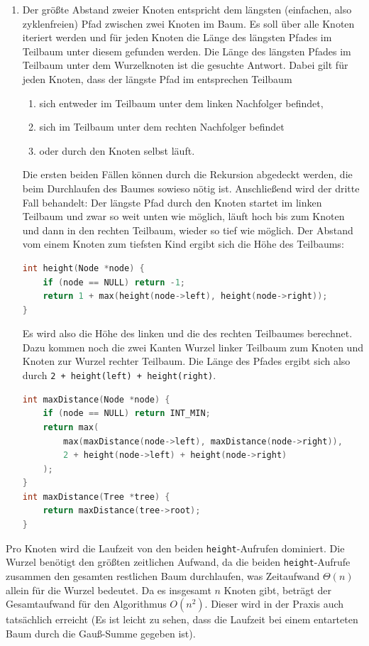 \documentclass[11pt,a4paper]{article}
\begin{document}
\begin{loesung}
\begin{enumerate}
        \item
        Der größte Abstand zweier Knoten entspricht dem längsten (einfachen, also zyklenfreien) Pfad zwischen zwei Knoten im Baum.
        Es soll über alle Knoten iteriert werden und für jeden Knoten die Länge des längsten Pfades im Teilbaum unter diesem gefunden werden.
        Die Länge des längsten Pfades im Teilbaum unter dem Wurzelknoten ist die gesuchte Antwort.
        Dabei gilt für jeden Knoten, dass der längste Pfad im entsprechen Teilbaum
        \begin{enumerate}[label=\arabic*.]
            \item sich entweder im Teilbaum unter dem linken Nachfolger befindet,
            \item sich im Teilbaum unter dem rechten Nachfolger befindet
            \item oder durch den Knoten selbst läuft.
        \end{enumerate}
        Die ersten beiden Fällen können durch die Rekursion abgedeckt werden, die beim Durchlaufen des Baumes sowieso nötig ist.
        Anschließend wird der dritte Fall behandelt:
        Der längste Pfad durch den Knoten startet im linken Teilbaum und zwar so weit unten wie möglich, läuft hoch bis zum Knoten und dann in den rechten Teilbaum, wieder so tief wie möglich.
        Der Abstand vom einem Knoten zum \glqq{}tiefsten\grqq{} Kind ergibt sich die Höhe des Teilbaums:
        \begin{lstlisting}[language=c++]
int height(Node *node) {
    if (node == NULL) return -1;
    return 1 + max(height(node->left), height(node->right));
}
        \end{lstlisting}
        Es wird also die Höhe des linken und die des rechten Teilbaumes berechnet.
        Dazu kommen noch die zwei Kanten \glqq{}Wurzel linker Teilbaum zum Knoten\grqq{} und \glqq{}Knoten zur Wurzel rechter Teilbaum\grqq{}.
        Die Länge des Pfades ergibt sich also durch \texttt{2 + height(left) + height(right)}.
        \begin{lstlisting}[language=c++]
int maxDistance(Node *node) {
    if (node == NULL) return INT_MIN;
    return max(
        max(maxDistance(node->left), maxDistance(node->right)),
        2 + height(node->left) + height(node->right)
    );
}
int maxDistance(Tree *tree) {
    return maxDistance(tree->root);
}
        \end{lstlisting}
    \end{enumerate}
    Pro Knoten wird die Laufzeit von den beiden \texttt{height}-Aufrufen dominiert.
    Die Wurzel benötigt den größten zeitlichen Aufwand, da die beiden \texttt{height}-Aufrufe zusammen den gesamten restlichen Baum durchlaufen, was Zeitaufwand $\Theta(n)$ allein für die Wurzel bedeutet.
    Da es insgesamt $n$ Knoten gibt, beträgt der Gesamtaufwand für den Algorithmus $O(n^2)$.
    Dieser wird in der Praxis auch tatsächlich erreicht (Es ist leicht zu sehen, dass die Laufzeit bei einem entarteten Baum durch die Gauß-Summe gegeben ist).


\end{loesung}
\end{document}
